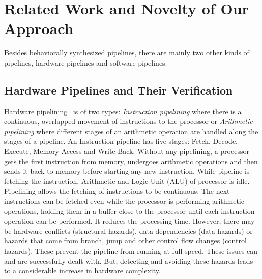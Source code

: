 \chapter{Related Work and Novelty of Our Approach}
\label{chapter:related-work}

Besides behaviorally synthesized pipelines, there are mainly two other kinds of pipelines, hardware pipelines and software pipelines. 

\section{Hardware Pipelines and Their Verification}

Hardware pipelining~\cite{Hennessy-2003} is of two types: {\em Instruction pipelining} where there is a continuous, 
overlapped movement of instructions to the processor or {\em Arithmetic pipelining} where 
different stages of an arithmetic operation are handled along the stages of a pipeline.
An Instruction pipeline has five stages: Fetch, Decode, Execute, Memory Access 
and Write Back. Without any pipelining, 
a processor gets the first instruction from memory, undergoes arithmetic operations 
and then sends it back to memory before starting any new instruction. While pipeline is 
fetching the instruction, Arithmetic and Logic Unit (ALU) of processor is idle. 
Pipelining allows the fetching of instructions to be continuous. The next 
instructions can be fetched even while the 
processor is performing arithmetic operations, holding them in a buffer close 
to the processor until each instruction operation can be performed. 
It reduces the processing time. However, there may be
hardware conflicts (structural hazards), data dependencies (data hazards) or hazards that come from 
branch, jump and other control flow changes (control hazards). These prevent the pipeline from
running at full speed. These issues can and are successfully dealt with. But,
detecting and avoiding these hazards leads to a considerable increase in hardware complexity. 

